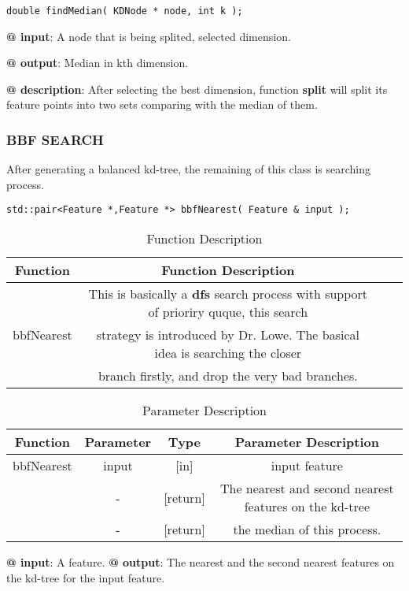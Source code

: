 \documentclass[paper=a4, fontsize=11pt]{scrartcl} %
\numberwithin{equation}{section} %
\numberwithin{figure}{section} %
\numberwithin{table}{section} %
\begin{document}
\begin{lstlisting}
double findMedian( KDNode * node, int k );
\end{lstlisting}

\textbf{@ input}: A node that is being splited, selected dimension.

\textbf{@ output}: Median in kth dimension.

\textbf{@ description}: After selecting the best dimension, function \textbf{split} will split its feature points into two sets comparing with the median of them.  \\

\subsubsection{BBF SEARCH}

After generating a balanced kd-tree, the remaining of this class is searching process.\\

\begin{lstlisting}
std::pair<Feature *,Feature *> bbfNearest( Feature & input );
\end{lstlisting}

\begin{table}[h]
    \centering
    \begin{tabular}{|c|c| lp{}}
        \hline
        \textbf{Function} & \textbf{Function Description} \\\hline
      \multirow{3}{*}{bbfNearest} & This is basically a \textbf{dfs} search process with support of prioriry quque, this search  \\& strategy is introduced by Dr. Lowe\cite{sift}. The basical idea is searching the closer \\& branch firstly, and drop the very bad branches.\\\hline
    \end{tabular}
    \caption{Function Description}\label{nolock}
\end{table}

\begin{table}[h]
    \centering
    \begin{tabular}{|c|c|c|c|}
        \hline
        \textbf{Function} & \textbf{Parameter} & \textbf{Type} & \textbf{Parameter Description} \\\hline
            bbfNearest & input & [in] & input feature \\
                            & - & [return] & The nearest and second nearest features on the kd-tree\\\hline
            & - & [return] & the median of this process. \\\hline
    \end{tabular}
    \caption{Parameter Description}\label{nolock}
\end{table}
\textbf{@ input}: A feature.
\textbf{@ output}: The nearest and the second nearest features on the kd-tree for the input feature.
\end{document}
